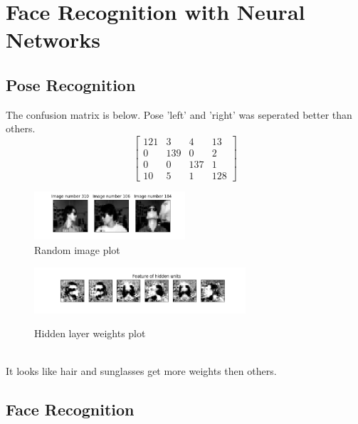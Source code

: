 \documentclass[a4paper]{article}
\begin{document}
\section{Face Recognition with Neural Networks}
\subsection{Pose Recognition}
The confusion matrix is below. Pose 'left' and 'right' was seperated better than others.\\
\[
\begin{bmatrix}
  121 & 3 & 4 & 13 \\
  0 & 139 & 0 & 2 \\
  0 & 0 & 137 & 1 \\
  10 & 5 & 1 & 128
\end{bmatrix}
\]
\begin{figure}[h]
  \begin{center}
  \includegraphics[width=0.5\textwidth]{ex_2_1_random.png}\\
  \caption{Random image plot}
  \includegraphics[width=0.7\textwidth]{ex_2_1_hidden.png}\\
  \caption{Hidden layer weights plot}
  \end{center}
\end{figure}\\
It looks like hair and sunglasses get more weights then others.
\subsection{Face Recognition}
\end{document}
